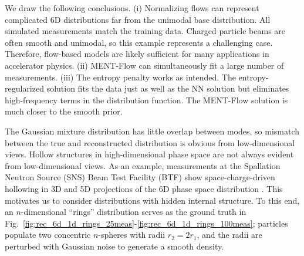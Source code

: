 \documentclass[%
    reprint,
    twocolumn,
    nofootinbib,
    amsmath,
    amssymb,
    aps,
    prstab,
]{revtex4-2}
\begin{document}
%
We draw the following conclusions. (i) Normalizing flows can represent complicated 6D distributions far from the unimodal base distribution. All simulated measurements match the training data. Charged particle beams are often smooth and unimodal, so this example represents a challenging case. Therefore, flow-based models are likely sufficient for many applications in accelerator physics. (ii) MENT-Flow can simultaneously fit a large number of measurements. (iii) The entropy penalty works as intended. The entropy-regularized solution fits the data just as well as the NN solution but eliminates high-frequency terms in the distribution function. The MENT-Flow solution is much closer to the smooth prior.

The Gaussian mixture distribution has little overlap between modes, so mismatch between the true and reconstructed distribution is obvious from low-dimensional views. Hollow structures in high-dimensional phase space are not always evident from low-dimensional views. As an example, measurements at the Spallation Neutron Source (SNS) Beam Test Facility (BTF) show space-charge-driven hollowing in 3D and 5D projections of the 6D phase space distribution \cite{Cathey_2018, Ruisard_2020, Hoover_2023}. This motivates us to consider distributions with hidden internal structure. To this end, an $n$-dimensional ``rings'' distribution serves as the ground truth in Fig.~\ref{fig:rec_6d_1d_rings_25meas}-\ref{fig:rec_6d_1d_rings_100meas}; particles populate two concentric $n$-spheres with radii $r_2 = 2r_1$, and the radii are perturbed with Gaussian noise to generate a smooth density.
%
\end{document}
